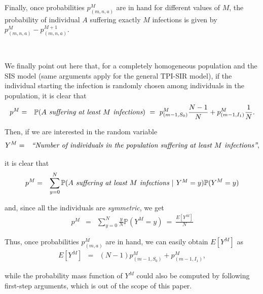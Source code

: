 \documentclass[preprint,12pt]{elsarticle}
\begin{document}
\par\noindent Finally, once probabilities $p^M_{(m,n,a)}$ are in hand for different values of $M$, the probability of individual $A$ suffering exactly
$M$ infections is given by $p^M_{(m,n,a)}-p^{M+1}_{(m,n,a)}$.\\

\vspace{0.5cm}

\par{}\\

\par We finally point out here that, for a completely homogeneous population and the SIS model (same arguments apply for the general TPI-SIR model), if the individual starting the infection is randomly chosen among individuals in the population, it is clear that
\begin{eqnarray*}
p^M &=& \mathbb{P}(\hbox{\it $A$ suffering at least $M$ infections}) \ = \ p^M_{(m-1,S_0)}\frac{N-1}{N}+p^M_{(m-1,I_1)}\frac{1}{N}.
\end{eqnarray*}
\par\noindent Then, if we are interested in the random variable
\begin{eqnarray*}
 Y^M &=& \hbox{\it ``Number of individuals in the population suffering at least $M$ infections''},
\end{eqnarray*}
\par\noindent it is clear that
\begin{eqnarray*}
 p^M &=& \sum\limits_{y=0}^N\mathbb{P}(\hbox{\it $A$ suffering at least $M$ infections $|$ $Y^M=y$})\mathbb{P}(Y^M=y)
\end{eqnarray*}
\par\noindent and, since all the individuals are {\it symmetric}, we get
\begin{eqnarray*}
 p^M &=& \sum\limits_{y=0}^N\frac{y}{N}\mathbb{P}(Y^M=y) \ = \ \frac{E[Y^M]}{N}
\end{eqnarray*}
\par\noindent Thus, once probabilities $p^M_{(m,a)}$ are in hand, we can easily obtain $E[Y^M]$ as
\begin{eqnarray*}
E[Y^M] &=& (N-1)p^M_{(m-1,S_0)}+p^M_{(m-1,I_1)},
\end{eqnarray*}
\par\noindent while the probability mass function of $Y^M$ could also be computed by following first-step arguments, which is out of the scope of
this paper.
\end{document}
